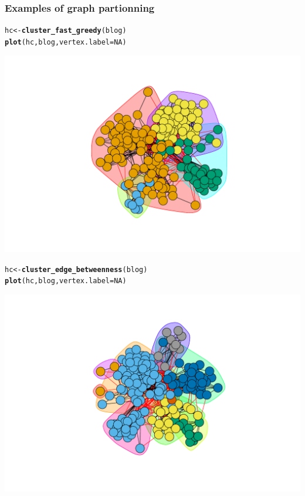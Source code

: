 \documentclass{beamer}\usepackage[]{graphicx}\usepackage[]{color}
\makeatletter
\newcommand{\hlnum}[1]{\textcolor[rgb]{0.686,0.059,0.569}{#1}}%
\newcommand{\hlstd}[1]{\textcolor[rgb]{0.345,0.345,0.345}{#1}}%
\newcommand{\hlkwb}[1]{\textcolor[rgb]{0.69,0.353,0.396}{#1}}%
\newcommand{\hlkwc}[1]{\textcolor[rgb]{0.333,0.667,0.333}{#1}}%
\newcommand{\hlkwd}[1]{\textcolor[rgb]{0.737,0.353,0.396}{\textbf{#1}}}%
\newenvironment{kframe}{%
 \def\at@end@of@kframe{}%
 \ifinner\ifhmode%
  \def\at@end@of@kframe{\end{minipage}}%
  \begin{minipage}{\columnwidth}%
 \fi\fi%
 \def\FrameCommand##1{\hskip\@totalleftmargin \hskip-\fboxsep
 \colorbox{shadecolor}{##1}\hskip-\fboxsep
     \hskip-\linewidth \hskip-\@totalleftmargin \hskip\columnwidth}%
 \MakeFramed {\advance\hsize-\width
   \@totalleftmargin\z@ \linewidth\hsize
   \@setminipage}}%
 {\par\unskip\endMakeFramed%
 \at@end@of@kframe}
\newenvironment{knitrout}{}{} %
\makeatother
\begin{document}
\begin{frame}
  \frametitle{Examples of graph partionning}

\begin{knitrout}\scriptsize
{}\color{fgcolor}\begin{kframe}
\begin{alltt}
\hlstd{hc} \hlkwb{<-} \hlkwd{cluster_fast_greedy}\hlstd{(blog)}
\hlkwd{plot}\hlstd{(hc, blog,} \hlkwc{vertex.label}\hlstd{=}\hlnum{NA}\hlstd{)}
\end{alltt}
\end{kframe}
\includegraphics[width=.8\textwidth]{figures/unnamed-chunk-2-1} 
\end{knitrout}

\begin{knitrout}\scriptsize
{}\color{fgcolor}\begin{kframe}
\begin{alltt}
\hlstd{hc} \hlkwb{<-} \hlkwd{cluster_edge_betweenness}\hlstd{(blog)}
\hlkwd{plot}\hlstd{(hc, blog,} \hlkwc{vertex.label}\hlstd{=}\hlnum{NA}\hlstd{)}
\end{alltt}
\end{kframe}
\includegraphics[width=.8\textwidth]{figures/unnamed-chunk-3-1} 
\end{knitrout}

\end{frame}
\end{document}
